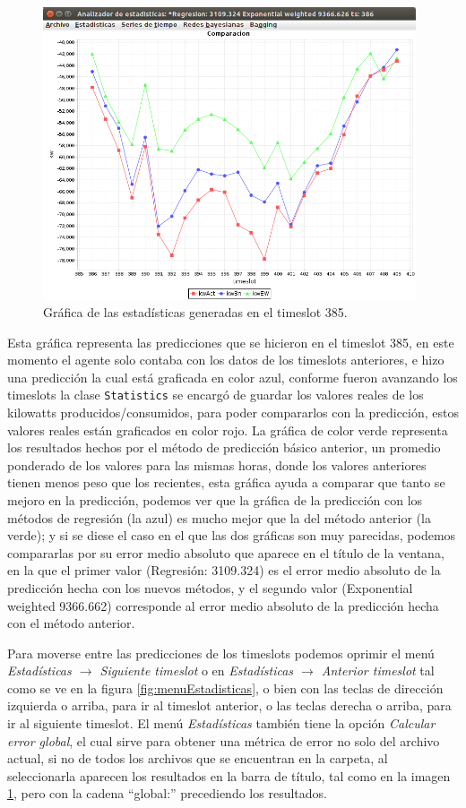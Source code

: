 \begin{figure}[h]
	\centering
	\includegraphics[width=11cm]{img/GraficaEstadisticas.png}
	\caption{Gráfica de las estadísticas generadas en el timeslot 385.}
	\label{fig:GraficaEstadisticas}
\end{figure}

Esta gráfica representa las predicciones que se hicieron en el timeslot 385, en este momento el agente solo contaba con los datos de los timeslots anteriores, e hizo una predicción la cual está graficada en color azul, conforme fueron avanzando los timeslots la clase \texttt{Statistics} se encargó de guardar los valores reales de los kilowatts producidos/consumidos, para poder compararlos con la predicción, estos valores reales están graficados en color rojo. La gráfica de color verde representa los resultados hechos por el método de predicción básico anterior, un promedio ponderado de los valores para las mismas horas, donde los valores anteriores tienen menos peso que los recientes, esta gráfica ayuda a comparar que tanto se mejoro en la predicción, podemos ver que la gráfica de la predicción con los métodos de regresión (la azul) es mucho mejor que la del método anterior (la verde); y si se diese el caso en el que las dos gráficas son muy parecidas, podemos compararlas por su error medio absoluto que aparece en el título de la ventana, en la que el primer valor (Regresión: 3109.324) es el error medio absoluto de la predicción hecha con los nuevos métodos, y el segundo valor (Exponential weighted 9366.662) corresponde al error medio absoluto de la predicción hecha con el método anterior.

Para moverse entre las predicciones de los timeslots podemos oprimir el menú \textit{Estadísticas $\rightarrow$ Siguiente timeslot} o en \textit{Estadísticas $\rightarrow$ Anterior timeslot} tal como se ve en la figura \ref{fig:menuEstadisticas}, o bien con las teclas de dirección izquierda o arriba, para ir al timeslot anterior, o las teclas derecha o arriba, para ir al siguiente timeslot.
El menú \textit{Estadísticas} también tiene la opción \textit{Calcular error global}, el cual sirve para obtener una métrica de error no solo del archivo actual, si no de todos los archivos que se encuentran en la carpeta, al seleccionarla aparecen los resultados en la barra de título, tal como en la imagen \ref{fig:GraficaEstadisticas}, pero con la cadena ``global:'' precediendo los resultados.


